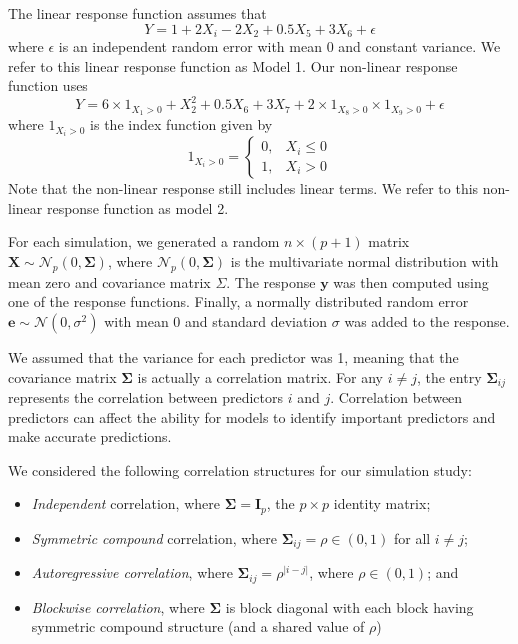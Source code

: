 \documentclass{article}
\begin{document}
	The linear response function assumes that
	\begin{equation}\label{eqn:linear-response}
		Y = 1 + 2X_i - 2X_2 + 0.5X_5 + 3X_6 + \epsilon
	\end{equation}
	where $\epsilon$ is an independent random error with mean 0 and constant variance. We refer to this linear response function as Model 1. Our non-linear response function uses
	\begin{equation}\label{eqn:nonlinear-response}
		Y = 6\times 1_{X_1 > 0} + X_2^2 + 0.5X_6 + 3X_7 + 2\times 1_{X_8 > 0}\times 1_{X_9>0} + \epsilon
	\end{equation}
	where $1_{X_i>0}$ is the index function given by
	\begin{equation}
		1_{X_i > 0} = \left\{\begin{array}{rl}
			0, & X_i \leq 0 \\
			1, & X_i > 0
		\end{array}\right.
	\end{equation}
	Note that the non-linear response still includes linear terms. We refer to this non-linear response function as model 2.
	
	For each simulation, we generated a random $n\times (p + 1)$ matrix $\mathbf{X}\sim \mathcal{N}_p(0, \mathbf{\Sigma})$, where $\mathcal{N}_p(0, \mathbf{\Sigma})$ is the multivariate normal distribution with mean zero and covariance matrix $\Sigma$. The response $\mathbf{y}$ was then computed using one of the response functions. Finally, a normally distributed random error $\mathbf{e}\sim \mathcal{N}(0, \sigma^2)$ with mean 0 and standard deviation $\sigma$ was added to the response.
	
	We assumed that the variance for each predictor was 1, meaning that the covariance matrix $\mathbf{\Sigma}$ is actually a correlation matrix. For any $i \neq j$, the entry $\mathbf{\Sigma}_{ij}$ represents the correlation between predictors $i$ and $j$. Correlation between predictors can affect the ability for models to identify important predictors and make accurate predictions.
	
	We considered the following correlation structures for our simulation study:
	\begin{itemize}\itemsep0pt
		\item \textit{Independent} correlation, where $\mathbf{\Sigma} = \mathbf{I}_p$, the $p\times p$ identity matrix;
		\item \textit{Symmetric compound} correlation, where $\mathbf{\Sigma}_{ij} = \rho \in (0, 1)$ for all $i \neq j$;
		\item \textit{Autoregressive correlation}, where $\mathbf{\Sigma}_{ij} = \rho^{\vert i - j \vert}$, where $\rho \in (0, 1)$; and
		\item \textit{Blockwise correlation}, where $\mathbf{\Sigma}$ is block diagonal with each block having symmetric compound structure (and a shared value of $\rho$)
	\end{itemize}
	
\end{document}
